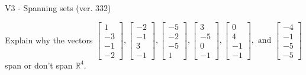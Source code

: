 \begin{exercise}
  \begin{exerciseTitle}V3 - Spanning sets (ver. 332)\end{exerciseTitle}
  \begin{exerciseStatement}
    Explain why the vectors \(\left[\begin{array}{r}
1 \\
-3 \\
-1 \\
-2
\end{array}\right] , \left[\begin{array}{r}
-2 \\
-1 \\
3 \\
-1
\end{array}\right] , \left[\begin{array}{r}
-5 \\
-2 \\
-5 \\
1
\end{array}\right] , \left[\begin{array}{r}
3 \\
-5 \\
0 \\
-1
\end{array}\right] , \left[\begin{array}{r}
0 \\
4 \\
-1 \\
-1
\end{array}\right] , \text{ and } \left[\begin{array}{r}
-4 \\
-1 \\
-5 \\
-5
\end{array}\right]\) span or don't span \(\mathbb{R}^4\). 
	



\end{exerciseStatement}
\end{exercise}

